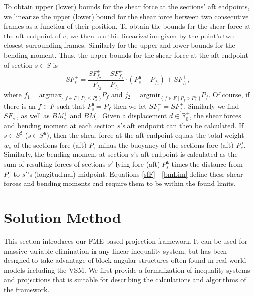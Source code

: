 \documentclass[citeauthoryear]{llncs}
\newcommand{\trt}[1]{\texttt{#1}}
\newcommand{\mi}{\mathit}
\newcommand{\set}[2]{\{\;{#1}\;|\;{#2}\;\}}
\begin{document}
To obtain upper (lower) bounds for the shear force at the sections' aft endpoints,  we linearize the upper (lower) bound for the shear force between two consecutive frames as a function of their position. To obtain the bounds for the shear force at the aft endpoint of $s$, we then use this linearization given by the point's two closest surrounding frames. Similarly for the upper and lower bounds for the bending moment. Thus, the upper bounds for the shear force at the aft endpoint of section $s\in S$ is
\[
\mi{SF}^+_s = \frac{\mi{SF}^+_{f_2}-\mi{SF}^+_{f_1}}{P_{f_2}-P_{f_1}}\cdot(P^\trt{a}_s - P_{f_1}) + \mi{SF}^+_{f_1}, 
\]
where $f_1 = \text{argmax}_{\set{f\in F}{P_f\leq P^\trt{a}_s}}P_f$ and $f_2 = \text{argmin}_{\set{f\in F}{P_f>P^\trt{a}_s}}P_f$. Of course, if there is an $f\in F$ such that $P^\trt{a}_s = P_f$ then we let $\mi{SF}^+_s = \mi{SF}^+_f$. Similarly we find $\mi{SF}^-_s$, as well as $\mi{BM}^+_s$ and $\mi{BM}^\trt{-}_s$. Given a displacement $d\in\mathbb{R}^+_0$, the shear forces and bending moment at each section $s$'s aft endpoint can then be calculated. If $s\in S^\trt{f}$ ($s\in S^\trt{a}$), then the shear force at the aft endpoint equals the total weight $w_s$ of the sections fore (aft) $P^\trt{a}_s$ minus the buoyancy of the sections fore (aft) $P^\trt{a}_s$. Similarly, the bending moment at section $s$'s aft endpoint is calculated as the sum of resulting forces of sections $s'$ lying fore (aft) $P^\trt{a}_s$ times the distance from $P^\trt{a}_s$ to $s'$'s (longitudinal) midpoint. Equations \eqref{sfF} - \eqref{bmLim} define these shear forces and bending moments and require them to be within the found limits.

\section{Solution Method} \label{sec:solutionMethod}

This section introduces our FME-based projection framework. It can be used for massive variable elimination in any linear inequality system, but has been designed to take advantage of block-angular structures often found in real-world models including the VSM. We first provide a formalization of inequality systems and projections that is suitable for describing the calculations and algorithms of the framework. 
\end{document}

